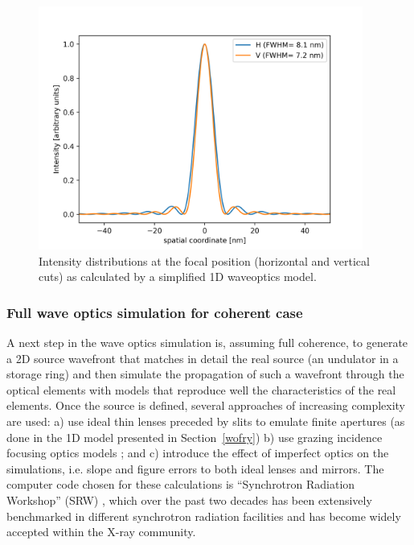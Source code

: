 \documentclass{iucr}              %
\newcommand{\inred}[1]{{\color{black}#1}}
\begin{document}
\begin{figure}
\label{wofry1D}
\centering
\includegraphics[width=0.95\textwidth]{GRAPHICS/wofry1D.png}
\caption{Intensity distributions at the focal position (horizontal and vertical cuts) as calculated by a simplified 1D waveoptics model. 
}
\end{figure}


\subsubsection{Full wave optics simulation for coherent case}
\label{srw_se}

A next step in the wave optics simulation is, assuming full coherence, to generate a 2D source wavefront that matches in detail the real source (an undulator in a storage ring) and then simulate the propagation of such a wavefront through the optical elements with models that reproduce well the characteristics of the real elements. Once the source is defined, several approaches of increasing complexity are used: a) use ideal thin lenses preceded by slits to emulate finite apertures (as done in the 1D model presented in Section~\ref{wofry}) b) use grazing incidence focusing optics models \cite{Canestrari2014}; and c) introduce the effect of imperfect optics on the simulations, i.e. slope and figure errors to both ideal lenses and mirrors. The computer code chosen for these calculations is ``Synchrotron Radiation Workshop'' (SRW) \cite{codeSRW}, which over the past two decades has been extensively benchmarked \inred{in} different synchrotron radiation facilities and has become widely accepted within the X-ray community. 
\end{document}
